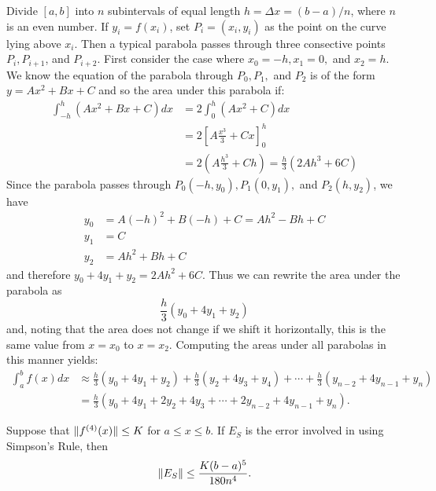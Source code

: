 \documentclass[a4paper,8pt]{article}
\begin{document}
\begin{outline}
    \begin{justification}
      Divide \([a,b]\) into \(n\) subintervals of equal length \(h = \Delta{x} = (b-a)/n\), where \(n\) is an even number.
      If \(y_i = f(x_i)\), set \(P_i = (x_i, y_i)\) as the point on the curve lying above \(x_i\). Then a typical
      parabola passes through three consective points \(P_i, P_{i+1}\), and \(P_{i+2}\). First consider the case
      where \(x_0 = -h, x_1 = 0,\) and \(x_2 = h\). We know the equation of the parabola through \(P_0, P_1,\) and \(P_2\)
      is of the form \(y = Ax^2 + Bx + C\) and so the area under this parabola if:
      \begin{align*}
        \int_{-h}^h (Ax^2+Bx+C)dx &= 2\int_0^h (Ax^2 + C) dx \\
                                  &= 2\left[ A\frac{x^3}{3} + Cx\right]_0^h \\
                                  &= 2\left( A\frac{h^3}{3} + Ch\right) = \frac{h}{3}(2Ah^3 + 6C)
      \end{align*}
      Since the parabola passes through \(P_0(-h, y_0), P_1(0, y_1),\) and \(P_2(h,y_2)\), we have
      \begin{align*}
        y_0 &= A(-h)^2 + B(-h) + C = Ah^2 - Bh + C \\
        y_1 &= C \\
        y_2 &= Ah^2 + Bh + C
      \end{align*}
      and therefore \(y_0 + 4y_1 + y_2 = 2Ah^2 + 6C\).
      Thus we can rewrite the area under the parabola as \[ \frac{h}{3}(y_0 + 4y_1 + y_2) \] and, noting that the area
      does not change if we shift it horizontally, this is the same value from \(x=x_0\) to \(x = x_2\).
      Computing the areas under all parabolas in this manner yields:
      \begin{align*}
        \int_a^bf(x)dx &\approx \frac{h}{3}(y_0+4y_1+y_2) + \frac{h}{3}(y_2+4y_3+y_4) + \cdots +
                                \frac{h}{3}(y_{n-2}+4y_{n-1}+y_n) \\
                       &= \frac{h}{3}(y_0 + 4y_1 + 2y_2 + 4y_3 + \cdots + 2y_{n-2} + 4y_{n-1} + y_n)\text{.}
      \end{align*}
    \end{justification}

    Suppose that \(\|f^{(4)}(x)\| \leq K\) for \(a \leq x \leq b\). If \(E_S\) is the error involved in using
    Simpson's Rule, then \[ \|E_S\| \leq \frac{K(b-a)^5}{180n^4}\text{.} \]


\end{outline}
\end{document}
